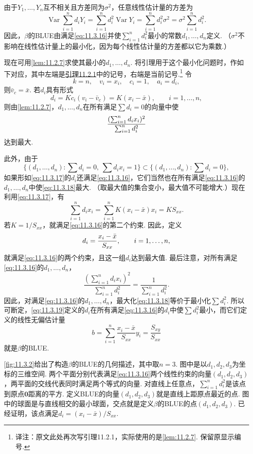 由于$Y_1,\ldots,Y_n$互不相关且方差同为$\sigma^2$，任意线性估计量的方差为
$$\operatorname{Var}\sum_{i=1}^nd_iY_i
=\sum_{i=1}^nd_i^2\operatorname{Var}Y_i
=\sum_{i=1}^nd_i^2\sigma^2=\sigma^2\sum_{i=1}^nd_i^2.$$
因此，$\beta$的BLUE由满足\eqref{eq:11.3.16}并使$\sum_{i=1}^nd_i^2$最小的常数$d_1,\ldots,d_n$定义. （$\sigma^2$不影响在线性估计量上的最小化，因为每个线性估计量的方差都以它为乘数.）

现在可用\autoref{lem:11.2.7}求使其最小的$d_1,\ldots,d_n$. 将引理用于这个最小化问题时，作如下对应，其中左端是\hyperref[lem:11.2.7]{引理11.2.1}中的记号，右端是当前记号.\footnote{译注：原文此处再次写引理11.2.1，实际使用的是\autoref{lem:11.2.7}. 保留原显示编号.} 令
$$k=n,\quad v_i=x_i,\quad c_i=1,\quad a_i=d_i,$$
则$\bar v_c=\bar x$. 若$d_i$具有形式
\begin{equation}\label{eq:11.3.17}
d_i=Kc_i(v_i-\bar v_c)=K(x_i-\bar x),\qquad i=1,\ldots,n,
\end{equation}
则由\autoref{lem:11.2.7}，$d_1,\ldots,d_n$在所有满足$\sum d_i=0$的向量中使
\begin{equation}\label{eq:11.3.18}\index{SI0681@二次函数的最大值}
\frac{(\sum_{i=1}^nd_ix_i)^2}{\sum_{i=1}^nd_i^2}
\end{equation}
达到最大.

此外，由于
$$\{(d_1,\ldots,d_n):\sum d_i=0,\ \sum d_ix_i=1\}
\subset\{(d_1,\ldots,d_n):\sum d_i=0\},$$
如果形如\eqref{eq:11.3.17}的$d_i$还满足\eqref{eq:11.3.16}，它们当然也在所有满足\eqref{eq:11.3.16}的$d_1,\ldots,d_n$中使\eqref{eq:11.3.18}最大. （取最大值的集合变小，最大值不可能增大.）现在利用\eqref{eq:11.3.17}，有
$$\sum_{i=1}^nd_ix_i=\sum_{i=1}^nK(x_i-\bar x)x_i=KS_{xx}.$$
若$K=1/S_{xx}$，就满足\eqref{eq:11.3.16}的第二个约束. 因此，定义
\begin{equation}\label{eq:11.3.19}\index{SI0882@斜率的最优线性无偏估计量}
d_i=\frac{x_i-\bar x}{S_{xx}},\qquad i=1,\ldots,n,
\end{equation}
就满足\eqref{eq:11.3.16}的两个约束，且这一组$d_i$达到最大值. 最后注意，对所有满足\eqref{eq:11.3.16}的$d_1,\ldots,d_n$，
$$\frac{(\sum_{i=1}^nd_ix_i)^2}{\sum_{i=1}^nd_i^2}=\frac1{\sum_{i=1}^nd_i^2}.$$
因此，对满足\eqref{eq:11.3.16}的$d_1,\ldots,d_n$，最大化\eqref{eq:11.3.18}等价于最小化$\sum d_i^2$. 所以可断定，\eqref{eq:11.3.19}定义的$d_i$在所有满足\eqref{eq:11.3.16}的$d_i$中使$\sum d_i^2$最小，而它们定义的线性无偏估计量
$$b=\sum_{i=1}^n\frac{x_i-\bar x}{S_{xx}}y_i=\frac{S_{xy}}{S_{xx}}$$
就是$\beta$的BLUE.

\autoref{fig:11.3.2}给出了构造$\beta$的BLUE的几何描述，其中取$n=3$. 图中是以$d_1,d_2,d_3$为坐标的三维空间. 两个平面分别代表满足\eqref{eq:11.3.16}两个线性约束的向量$(d_1,d_2,d_3)$，两平面的交线代表同时满足两个等式的向量. 对直线上任意点，$\sum_{i=1}^nd_i^2$是该点到原点$\boldsymbol0$距离的平方. 定义BLUE的向量$(d_1,d_2,d_3)$就是直线上距原点最近的点. 图中的球面是与直线相交的最小球面，交点就是定义$\beta$的BLUE的点$(d_1,d_2,d_3)$. 已经证明，该点满足$d_i=(x_i-\bar x)/S_{xx}$.

